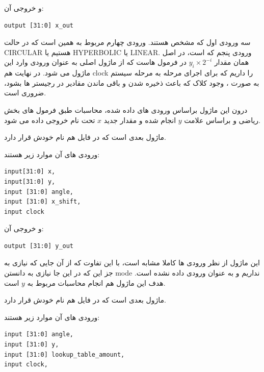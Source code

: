 \documentclass[12pt,titlepage,a4page , tikz , multi,table , svgnames,xcdraw]{article}
\begin{document}
و خروجی آن:

\begin{latin}
\begin{verbatim}
output [31:0] x_out
\end{verbatim}
\end{latin}

سه ورودی اول که مشخص هستند. ورودی چهارم مربوط به همین است که در حالت CIRCULAR هستیم یا HYPERBOLIC یا LINEAR. ورودی پنجم که  است، در اصل همان مقدار $y_i \times 2^{-i}$ در فرمول هاست که از ماژول اصلی به عنوان ورودی وارد این ماژول می شود. در نهایت هم clock را داریم که برای اجرای مرحله به مرحله سیستم به صورت ، وجود کلاک که باعث ذخیره شدن و باقی ماندن مقادیر در رجیستر ها بشود، ضروری است.

درون این ماژول براساس ورودی های داده شده، محاسبات طبق فرمول های بخش ریاضی و براساس علامت $y$ انجام شده و مقدار جدید $x$ تحت نام  خروجی داده می شود.

\hrulefill
 

ماژول بعدی  است که در فایل هم نام خودش قرار دارد.

 
 ورودی های آن موارد زیر هستند:

\begin{latin}
\begin{verbatim}
input[31:0] x,
input[31:0] y,
input [31:0] angle,
input [31:0] x_shift,
input clock
\end{verbatim}
\end{latin}

و خروجی آن:

\begin{latin}
\begin{verbatim}
output [31:0] y_out
\end{verbatim}
\end{latin}

این ماژول از نظر ورودی ها کاملا مشابه  است، با این تفاوت که از آن جایی که نیازی به جز این که در این جا نیازی به دانستن mode نداریم و به عنوان ورودی داده نشده است. هدف این ماژول هم انجام محاسبات مربوط به $y$ است.

\hrulefill


ماژول بعدی  است که در فایل هم نام خودش قرار دارد.

 
 ورودی های آن موارد زیر هستند:

\begin{latin}
\begin{verbatim}
input [31:0] angle,
input [31:0] y,
input [31:0] lookup_table_amount,
input clock,
\end{verbatim}
\end{latin}
\end{document}
